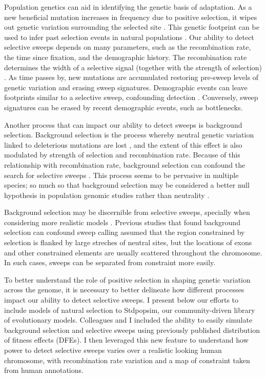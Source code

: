 Population genetics can aid in identifying the genetic basis of adaptation.
As a new beneficial mutation increases in frequency due to positive selection,
it wipes out genetic variation surrounding the selected site \citep{smith_hitch-hiking_1974, kaplan_hitchhiking_1989}.
This genetic footprint can be used to infer past selection events in natural populations \citep{nielsen_estimation_2000, hernandez_classic_2011, garud_recent_2015, schrider_soft_2017, przeworski_signature_2002, enard_genome-wide_2014, williamson_evidence_2014}.
Our ability to detect selective sweeps depends on many parameters, such as the recombination rate, the time since fixation, and the demographic history.
The recombination rate determines the width of a selective signal (together with the strength of selection) \citep{kaplan_hitchhiking_1989}.
As time passes by, new mutations are accumulated restoring pre-sweep levels of genetic variation and erasing sweep signatures.
Demographic events can leave footprints similar to a selective sweep, confounding detection \citep{przeworski_signature_2002, jensen_distinguishing_2005}.
Conversely, sweep signatures can be erased by recent demographic events, such as bottlenecks.

Another process that can impact our ability to detect sweeps is background selection.
Background selection is the process whereby neutral genetic variation linked to deleterious mutations are lost \citep{charlesworth_effect_1993}, and the extent of this effect is also modulated by strength of selection and recombination rate.
Because of this relationship with recombination rate, background selection can confound the search for selective sweeps \citep{andolfatto_adaptive_2001}.
This process seems to be pervasive in multiple species; so much so that background selection may be considered a better null hypothesis in population genomic studies rather than neutrality \citep{comeron_background_2017}.

Background selection may be discernible from selective sweeps, specially when considering more realistic models \citep{schrider_background_2020}.
Previous studies that found background selection can confound sweep calling assumed that the region constrained by selection is flanked by large streches of neutral sites,
but the locations of exons and other constrained elements are usually scattered throughout the chromosome.
In such cases, sweeps can be separated from constraint more easily.

To better understand the role of positive selection in shaping genetic variation across the genome,
it is necessary to better delineate how different processes impact our ability to detect selective sweeps.
I present below our efforts to include models of natural selection to Stdpopsim, our community-driven library of evolutionary models.
Colleagues and I included the ability to easily simulate background selection and selective sweeps using previously published distribution of fitness effects (DFEs).
I then leveraged this new feature to understand how power to detect selective sweeps varies over a realistic looking human chromosome,
with recombination rate variation and a map of constraint taken from human annotations.

